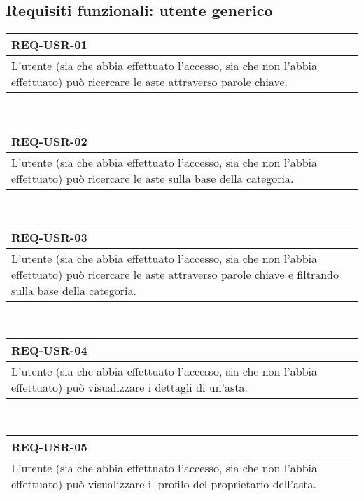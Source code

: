        \subsection{Requisiti funzionali: utente generico}
        \begin{tabular}{|p{}|}
            \hline
            \multicolumn{1}{|l|}{\cellcolor{head}\textbf{REQ-USR-01}} \\
            \hline
            L'utente (sia che abbia effettuato l'accesso, sia che non l'abbia effettuato) può ricercare le aste attraverso parole chiave. \\
            \hline
        \end{tabular} \smallskip \\
        \begin{tabular}{|p{}|}
            \hline
            \multicolumn{1}{|l|}{\cellcolor{head}\textbf{REQ-USR-02}} \\
            \hline
            L'utente (sia che abbia effettuato l'accesso, sia che non l'abbia effettuato) può ricercare le aste sulla base della categoria. \\
            \hline
        \end{tabular} \smallskip \\
        \begin{tabular}{|p{}|}
            \hline
            \multicolumn{1}{|l|}{\cellcolor{head}\textbf{REQ-USR-03}} \\
            \hline
            L'utente (sia che abbia effettuato l'accesso, sia che non l'abbia effettuato) può ricercare le aste attraverso parole chiave e filtrando sulla base della categoria. \\
            \hline
        \end{tabular} \smallskip \\
        \begin{tabular}{|p{}|}
            \hline
            \multicolumn{1}{|l|}{\cellcolor{head}\textbf{REQ-USR-04}} \\
            \hline
            L'utente (sia che abbia effettuato l'accesso, sia che non l'abbia effettuato) può visualizzare i dettagli di un'asta. \\
            \hline
        \end{tabular} \smallskip \\
        \begin{tabular}{|p{}|}
            \hline
            \multicolumn{1}{|l|}{\cellcolor{head}\textbf{REQ-USR-05}} \\
            \hline
            L'utente (sia che abbia effettuato l'accesso, sia che non l'abbia effettuato) può visualizzare il profilo del proprietario dell'asta. \\
            \hline
        \end{tabular} \smallskip \\
